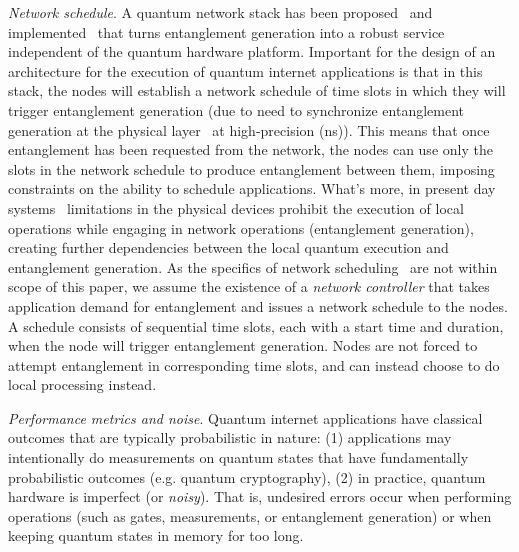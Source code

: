 \textit{Network schedule}.
A quantum network stack has been proposed~\cite{dahlberg2019link} and implemented~\cite{pompili2022experimental} that turns entanglement generation into a robust service independent of the quantum hardware platform.
Important for the design of an architecture for the execution of quantum internet applications is that in this stack, the nodes will establish a network schedule of time slots in which they will trigger entanglement generation (due to need to synchronize entanglement generation at the physical layer~\cite{dahlberg2019link} at high-precision (ns)).
This means that once entanglement has been requested from the network, the nodes can use only the slots in the network schedule to produce entanglement between them, imposing constraints on the ability to schedule applications. What's more, in present day systems~\cite{pompili2021realization, krutyanskiy2023entanglement} limitations in the physical devices prohibit the execution of local operations while engaging in network operations (entanglement generation), creating further dependencies between the local quantum execution and entanglement generation. 
As the specifics of network scheduling~\cite{network-scheduling, skrzypczyk2021architecture} are not within scope of this paper,
we assume the existence of a \textit{network controller} that takes application demand for entanglement and issues a network schedule to the nodes. 
A schedule consists of sequential time slots, each with a start time and duration, when the node will trigger entanglement generation.
Nodes are not forced to attempt entanglement in corresponding time slots, and can instead choose to do local processing instead.


\textit{Performance metrics and noise}. Quantum internet applications have classical outcomes that are typically probabilistic in nature:
(1) applications may intentionally do measurements on quantum states that have fundamentally probabilistic outcomes (e.g. quantum cryptography),
(2) in practice, quantum hardware is imperfect (or \textit{noisy}). That is, undesired errors occur
when performing operations (such as gates, measurements, or entanglement generation) or when keeping quantum states in memory for too long.

